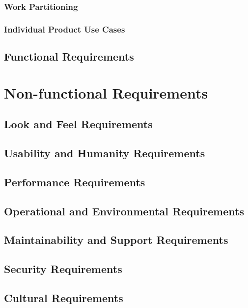 \documentclass[12pt, titlepage]{article}
\begin{document}
\subsubsection{Work Partitioning}

\subsubsection{Individual Product Use Cases}

\subsection{Functional Requirements}

\section{Non-functional Requirements}

\subsection{Look and Feel Requirements}

\subsection{Usability and Humanity Requirements}

\subsection{Performance Requirements}

\subsection{Operational and Environmental Requirements}

\subsection{Maintainability and Support Requirements}

\subsection{Security Requirements}

\subsection{Cultural Requirements}
\end{document}

